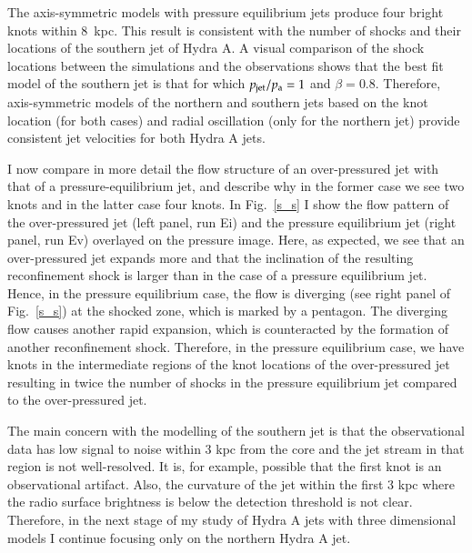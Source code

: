 The axis-symmetric models with pressure equilibrium jets produce four bright knots within 8~kpc. This result is consistent with the number of shocks and their locations of the southern jet of Hydra A. A visual comparison of the shock locations between the simulations and the observations shows that the best fit model of the southern jet is that for which $p_{\rm jet}/p_{\rm a} =1$ and $\beta = 0.8$. Therefore, axis-symmetric models of the northern and southern jets based on the knot location (for both cases) and radial oscillation (only for the northern jet) provide consistent jet velocities for both Hydra A jets. 

I now compare in more detail the flow structure of an over-pressured jet with that of a pressure-equilibrium jet, and describe why in the former case we see two knots and in the latter case four knots. In Fig.~\ref{s_s} I show the flow pattern of the over-pressured jet (left panel, run Ei) and the pressure equilibrium jet (right panel, run Ev) overlayed on the pressure image. Here, as expected, we see that an over-pressured jet expands more and that the inclination of the resulting reconfinement shock is larger than in the case of a pressure equilibrium jet. Hence, in the pressure equilibrium case, the flow is diverging (see right panel of Fig.~\ref{s_s}) at the shocked zone, which is marked by a pentagon. The diverging flow causes another rapid expansion, which is counteracted by the formation of another reconfinement shock. Therefore, in the pressure equilibrium case, we have knots in the intermediate regions of the knot locations of the over-pressured jet resulting in twice the number of shocks in the pressure equilibrium jet compared to the over-pressured jet. 

The main concern with the modelling of the southern jet is that the observational data has low signal to noise within 3 kpc from the core and the jet stream in that region is not well-resolved. It is, for example, possible that the first knot is an observational artifact. Also, the curvature of the jet within the first 3 kpc where the radio surface brightness is below the detection threshold is not clear. Therefore, in the next stage of my study of Hydra A jets with three dimensional models I continue focusing only on the northern Hydra A jet. 


